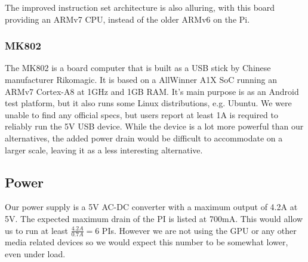 The improved instruction set architecture is also alluring, with this board providing an ARMv7 CPU, instead of the older ARMv6 on the Pi.

\subsubsection{MK802}
The MK802 is a board computer that is built as a USB stick by Chinese manufacturer Rikomagic.
It is based on a AllWinner A1X SoC running an ARMv7 Cortex-A8 at 1GHz and 1GB RAM. It's main purpose is as an Android test platform, but it also runs some Linux distributions, e.g. Ubuntu.
We were unable to find any official specs, but users report at least 1A is required to reliably run the 5V USB device. 
While the device is a lot more powerful than our alternatives, the added power drain would be difficult to accommodate on a larger scale, leaving it as a less interesting alternative.

\subsection{Power}
Our power supply is a 5V AC-DC converter with a maximum output of 4.2A at 5V. The expected maximum drain of the PI is listed at 700mA\cite{raspi_power_drain}. This would allow us to run at least $\frac{4.2A}{0.7A}=6$ PIs.
However we are not using the GPU or any other media related devices so we would expect this number to be somewhat lower, even under load.
